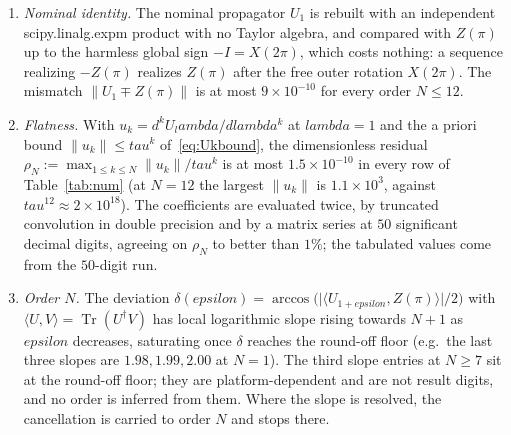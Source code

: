 \documentclass[%
  aps,
  pra,
  preprint,
  superscriptaddress,
  amsmath,amssymb,
  nofootinbib,
  floatfix,
]{revtex4-2}
\def\lambda{lambda}\def\tau{tau}\def\phi{phi}\def\alpha{alpha}%
\def\eps{epsilon}\def\C{C}\def\R{R}\def\lean#1{#1}\def\mathrm#1{#1}%
\theoremstyle{definition}
\theoremstyle{remark}
\newcommand{\Tr}{\operatorname{Tr}}
\newcommand{\C}{\mathbb C}
\newcommand{\R}{\mathbb R}
\newcommand{\eps}{\varepsilon}
\newcommand{\tauvar}{\tau}
\DeclareRobustCommand{\lean}[1]{\path{#1}}
\begin{document}
\begin{enumerate}[label=(\roman*),leftmargin=2.1em,itemsep=0.15em]
\item \emph{Nominal identity.} The nominal propagator $U_1$ is rebuilt with an independent
  \lean{scipy.linalg.expm} product with no Taylor algebra, and compared
  with $Z(\pi)$ up to the harmless global sign $-I=X(2\pi)$, which costs nothing: a sequence
  realizing $-Z(\pi)$ realizes $Z(\pi)$ after the free outer rotation $X(2\pi)$.
  The mismatch $\lVert U_1\mp Z(\pi)\rVert$ is at most
  $9\times10^{-10}$ for every order $N\le12$.
\item \emph{Flatness.} With $u_k=\mathrm{d}^kU_\lambda/\mathrm{d}\lambda^k$ at $\lambda=1$ and the a priori
  bound $\lVert u_k\rVert\le\tauvar^k$ of~\eqref{eq:Ukbound}, the dimensionless residual
  $\rho_N:=\max_{1\le k\le N}\lVert u_k\rVert/\tauvar^k$ is at most
  $1.5\times10^{-10}$ in every row of Table~\ref{tab:num} (at $N=12$ the largest
  $\lVert u_k\rVert$ is $1.1\times10^{3}$, against
  $\tauvar^{12}\approx2\times10^{18}$). The coefficients are evaluated twice, by truncated
  convolution in double precision and by a matrix series at $50$ significant decimal digits, agreeing
  on $\rho_N$ to better than $1\%$; the tabulated values come from the $50$-digit run.
\item \emph{Order $N$.} The deviation
  $\delta(\eps)=\arccos\bigl(\lvert\langle U_{1+\eps},Z(\pi)\rangle\rvert/2\bigr)$ with
  $\langle U,V\rangle=\Tr(U^\dagger V)$ has local logarithmic slope rising towards $N+1$ as $\eps$
  decreases, saturating once $\delta$ reaches the round-off floor (e.g.\ the last three slopes are $1.98,1.99,2.00$ at $N=1$).
  The third slope entries at $N\ge7$ sit at the round-off floor; they are platform-dependent and are not result digits, and no order is inferred from them. Where the
  slope is resolved, the cancellation is carried to order $N$ and stops there.
\end{enumerate}

\begin{table}[t]\centering\small
\caption{One admissible sequence per order at $\phi=\pi$, for $N\le12$: number $L$ of costly
segments, cost $T=\sum_j\theta_j$ (so $T_{\min}(N,\pi)\le T$; no row is claimed to be optimal
or to be a certified minimum), ratio to the equiangular cost $(2N+1)\pi$ of
Ref.~\cite{Low2014}, and the independent re-verification described in the text---nominal
mismatch, dimensionless flatness residual
$\rho_N=\max_{k\le N}\lVert u_k\rVert/\tauvar^k$ of~\eqref{eq:Ukbound} with $\tauvar=T/2$, and
the last three local logarithmic slopes of $\delta(\eps)$, to be read against $N+1$. The angle
lists are distributed with the data set of Ref.~\cite{DataRepo}.}
\label{tab:num}

\end{table}
\end{document}
